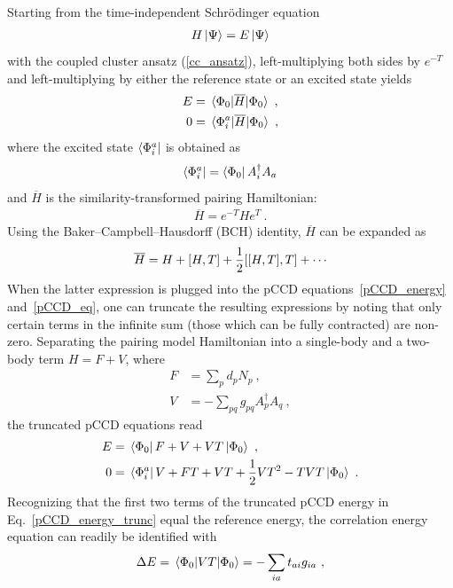 \documentclass[aps,pre,floatfix,showpacs,twocolumn, preprintnumbers]{revtex4-1}
\begin{document}
Starting from the time-independent Schr\"{o}dinger equation \begin{align}
H\ket{\Psi}=E\ket{\Psi}
\end{align}
with the coupled cluster ansatz (\ref{cc_ansatz}), left-multiplying both sides by $e^{-T}$ and left-multiplying by either the reference state or an excited state yields
\begin{align}
\label{pCCD_energy}
E&=\mel{\Phi_0}{\overline{H}}{\Phi_0}\ ,
\\
\label{pCCD_eq}
0&=\mel{\Phi_i^a}{\overline{H}}{\Phi_0}\ ,
\end{align}
where the excited state $\bra{\Phi_i^a}$ is obtained as
\begin{equation}
\bra{\Phi_i^a}=\bra{\Phi_0}A^\dagger_iA_a
\end{equation}
and $\overline{H}$ is the similarity-transformed pairing Hamiltonian:
\begin{align}
\overline{H}=e^{-T}He^T\ .
\end{align}
Using the Baker–Campbell–Hausdorff (BCH) identity, $\overline{H}$ can be expanded as
\begin{align}
\label{sim_H_p}
\overline{H}=H+\comm{H}{T}+\frac{1}{2}\comm{\comm{H}{T}}{T}+\cdots
\end{align}
When the latter expression is plugged into the pCCD equations~\eqref{pCCD_energy} and~\eqref{pCCD_eq}, one can truncate the resulting expressions by noting that only certain terms in the infinite sum (those which can be fully contracted) are non-zero. Separating the pairing model Hamiltonian into a single-body and a two-body term $H=F+V$, where
\begin{align}
F &= \sum_pd_pN_p\ , \nonumber \\
V &= -\sum_{pq}g_{pq}A^\dagger_pA_q\ ,
\end{align}
the truncated pCCD equations read
\begin{align}
E &= \bra*{\Phi_0}F+V+V T\ket{\Phi_0}\ , \label{pCCD_energy_trunc} \\
0 &=
\bra*{\Phi_i^a}V+F T+V T +\frac{1}{2}V T^2-T V T \ket{\Phi_0}\label{trunc_pCCD_eq}\ .
\end{align}
Recognizing that the first two terms of the truncated pCCD energy in Eq.~\eqref{pCCD_energy_trunc} equal the reference energy, the correlation energy equation can readily be identified with
\begin{equation}
\label{pCCD_e_corr}
\Delta E = \mel{\Phi_0}{V T}{\Phi_0}=-\sum_{ia}t_{ai}g_{ia}\ ,
\end{equation}
\end{document}
